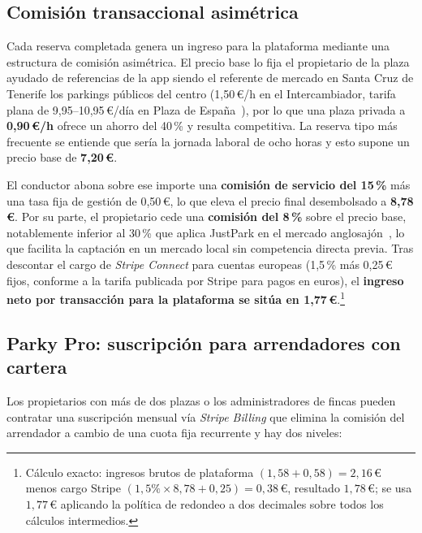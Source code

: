 \subsection{Comisión transaccional asimétrica}
\label{subsec:comision_transaccional}

Cada reserva completada genera un ingreso para la plataforma mediante una estructura de comisión asimétrica. El precio base lo fija el propietario de la plaza ayudado de referencias de la app siendo el referente de mercado en Santa Cruz de Tenerife los parkings públicos del centro (1,50\,€/h en el Intercambiador, tarifa plana de 9,95--10,95\,€/día en Plaza de España~\cite{ayto_sct_parkings}), por lo que una plaza privada a \textbf{0,90\,€/h} ofrece un ahorro del 40\,\% y resulta competitiva. La reserva tipo más frecuente se entiende que sería la jornada laboral de ocho horas y esto supone un precio base de \textbf{7,20\,€}.

El conductor abona sobre ese importe una \textbf{comisión de servicio del 15\,\%} más una tasa fija de gestión de 0,50\,€, lo que eleva el precio final desembolsado a \textbf{8,78\,€}. Por su parte, el propietario cede una \textbf{comisión del 8\,\%} sobre el precio base, notablemente inferior al 30\,\% que aplica JustPark en el mercado anglosajón~\cite{justpark_commission}, lo que facilita la captación en un mercado local sin competencia directa previa. Tras descontar el cargo de \textit{Stripe Connect} para cuentas europeas (1,5\,\% más 0,25\,€ fijos, conforme a la tarifa publicada por Stripe para pagos en euros), el \textbf{ingreso neto por transacción para la plataforma se sitúa en 1,77\,€}.\footnote{Cálculo exacto: ingresos brutos de plataforma $(1{,}58 + 0{,}58) = 2{,}16$\,€ menos cargo Stripe $(1{,}5\%\times 8{,}78 + 0{,}25) = 0{,}38$\,€, resultado $1{,}78$\,€; se usa $1{,}77$\,€ aplicando la política de redondeo a dos decimales sobre todos los cálculos intermedios.}

\subsection{Parky Pro: suscripción para arrendadores con cartera}
\label{subsec:parky_pro}

Los propietarios con más de dos plazas o los administradores de fincas pueden contratar una suscripción mensual vía \textit{Stripe Billing} que elimina la comisión del arrendador a cambio de una cuota fija recurrente y hay dos niveles:

